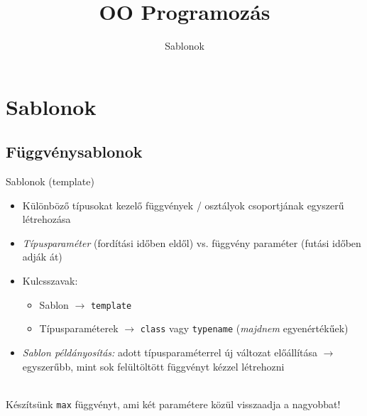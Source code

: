 \documentclass[usenames,dvipsnames,aspectratio=169]{beamer}
\title[OO Programozás - C++]{OO Programozás}
\subtitle{Sablonok}
\begin{document}
\begin{frame}[plain]
  \titlepage
  \logoalul
\end{frame}

\section{Sablonok}

\subsection{Függvénysablonok}

\begin{frame}
    Sablonok (template)
    \begin{itemize}
        \item Különböző típusokat kezelő függvények / osztályok csoportjának egyszerű létrehozása
        \item \emph{Típusparaméter} (fordítási időben eldől) vs. függvény paraméter (futási időben adják át)
        \item Kulcsszavak:
        \begin{itemize}
            \item Sablon $\to$ \texttt{template}
            \item Típusparaméterek $\to$ \texttt{class} vagy \texttt{typename} (\emph{majdnem} egyenértékűek)
        \end{itemize}
        \item \emph{Sablon példányosítás:} adott típusparaméterrel új változat előállítása $\to$ egyszerűbb, mint sok felültöltött függvényt kézzel létrehozni
    \end{itemize}
    \vfill
    \begin{description}[m]
        \item[Feladat:] \hfill \\ Készítsünk \texttt{max} függvényt, ami két paramétere közül visszaadja a nagyobbat!
    \end{description}
\end{frame}

\begin{frame}
    \begin{exampleblock}{}
        
    \end{exampleblock}
\end{frame}
\end{document}
